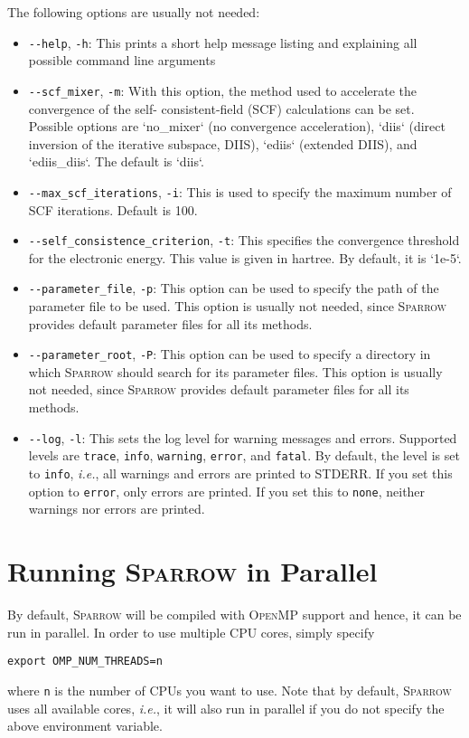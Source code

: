 \documentclass[]{tufte-book}
\begin{document}
The following options are usually not needed:

\begin{itemize}
\item \texttt{-{}-help}, \texttt{-h}: This prints a short help message listing and explaining all possible command line 
arguments
\item \texttt{-{}-scf\_mixer}, \texttt{-m}: With this option, the method used to accelerate the convergence of the self-
consistent-field (SCF) calculations can be set. Possible options are `no\_mixer` (no convergence acceleration), `diis`
(direct inversion of the iterative subspace, DIIS), `ediis` (extended DIIS), and `ediis\_diis`. The
default is `diis`.
\item \texttt{-{}-max\_scf\_iterations}, \texttt{-i}: This is used to specify the maximum number of SCF iterations. Default is 100.
\item \texttt{-{}-self\_consistence\_criterion}, \texttt{-t}: This specifies the convergence threshold for the electronic energy.
This value is given in hartree. By default, it is `1e-5`. 
\item \texttt{-{}-parameter\_file}, \texttt{-p}: This option can be used to specify the path of the parameter file to be
used. This option is usually not needed, since \textsc{Sparrow} provides default parameter files for all its methods.
\item \texttt{-{}-parameter\_root}, \texttt{-P}: This option can be used to specify a directory in which \textsc{Sparrow}
should search for its parameter files. This option is usually not needed, since \textsc{Sparrow} provides default parameter 
files for all its methods.
\item \texttt{-{}-log}, \texttt{-l}: This sets the log level for warning messages and errors. Supported levels are 
\texttt{trace}, \texttt{info}, \texttt{warning}, \texttt{error}, and \texttt{fatal}. By default, the level is set to
\texttt{info}, \textit{i.e.}, all warnings and errors are printed to STDERR. If you set this option to \texttt{error}, 
only errors are printed. If you set this to \texttt{none}, neither warnings nor errors are printed.
\end{itemize}


\section{Running \textsc{Sparrow} in Parallel}

By default, \textsc{Sparrow} will be compiled with \textsc{OpenMP} support and hence, it can be run in parallel. In order
to use multiple CPU cores, simply specify
\begin{verbatim}
export OMP_NUM_THREADS=n
\end{verbatim}
where \texttt{n} is the number of CPUs you want to use. Note that by default, \textsc{Sparrow} uses all available cores,
\textit{i.e.}, it will also run in parallel if you do not specify the above environment variable.
\end{document}
